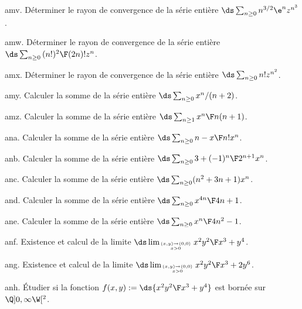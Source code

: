 \exo [Level=2,Fight=0,Learn=0,Field=\SériesEntières,Type=\Exercices,Origin=] amv. 
Déterminer le rayon de convergence de la  série entière $\ds\sum_{n\ge0}n^{3/2}\e^nz^{n^3}$.

\exo [Level=2,Fight=0,Learn=0,Field=\SériesEntières,Type=\Exercices,Origin=] amw. 
Déterminer le rayon de convergence de la  série entière $\ds\sum_{n\ge0}{(n!)^2\F(2n)!}z^n$.

\exo [Level=2,Fight=0,Learn=0,Field=\SériesEntières,Type=\Exercices,Origin=] amx. 
Déterminer le rayon de convergence de la  série entière $\ds\sum_{n\ge0}n!z^{n^2}$. 

\exo [Level=2,Fight=1,Learn=0,Field=\SériesEntières,Type=\Exercices,Origin=] amy. 
Calculer la somme de la série entière $\ds\sum_{n\ge0}x^n/(n+2)$.

\exo [Level=2,Fight=1,Learn=0,Field=\SériesEntières,Type=\Exercices,Origin=] amz. 
Calculer la somme de la série entière $\ds\sum_{n\ge1}{x^n\F n(n+1)}$.

\exo [Level=2,Fight=1,Learn=0,Field=\SériesEntières,Type=\Exercices,Origin=] ana. 
Calculer la somme de la série entière $\ds\sum_{n\ge0}{n-x\F n!}x^n$.

\exo [Level=2,Fight=1,Learn=0,Field=\SériesEntières,Type=\Exercices,Origin=] anb. 
Calculer la somme de la série entière $\ds\sum_{n\ge0}{3+(-1)^n\F 2^{n+1}}x^n$.

\exo [Level=2,Fight=1,Learn=0,Field=\SériesEntières,Type=\Exercices,Origin=] anc. 
Calculer la somme de la série entière $\ds\sum_{n\ge0}(n^2+3n+1)x^n$.

\exo [Level=2,Fight=1,Learn=0,Field=\SériesEntières,Type=\Exercices,Origin=] and. 
Calculer la somme de la série entière $\ds\sum_{n\ge0}{x^{4n}\F 4n+1}$.

\exo [Level=2,Fight=1,Learn=0,Field=\SériesEntières,Type=\Exercices,Origin=] ane. 
Calculer la somme de la série entière $\ds\sum_{n\ge0}{x^n\F4n^2-1}$. 

\exo [Level=2,Fight=2,Learn=2,Field=\FonctionsDePlusieursVariables,Type=\TravauxDirigés,Origin=] anf. 
Existence et calcul de la limite $\ds \lim_{(x,y)\to(0,0)\atop x>0}{x^2y^2\F x^3+y^4}$.

\exo [Level=2,Fight=2,Learn=2,Field=\FonctionsDePlusieursVariables,Type=\TravauxDirigés,Origin=] ang. 
Existence et calcul de la limite $\ds \lim_{(x,y)\to(0,0)\atop x>0}{x^2y^2\F x^3+2y^6}$. 

\exo [Level=2,Fight=2,Learn=2,Field=\FonctionsDePlusieursVariables,Type=\TravauxDirigés,Origin=] anh. 
\'Etudier si la fonction  $f(x,y):=\ds{x^2y^2\F x^3+y^4}$ est bornée sur $\Q]0,\infty\W[^2$.
 
